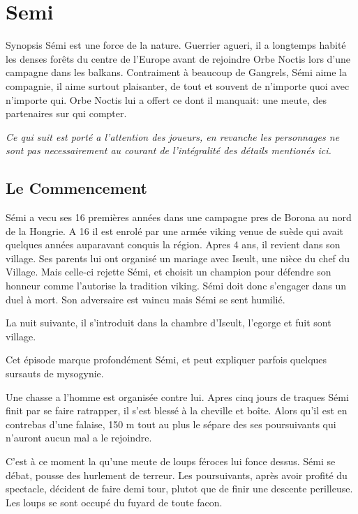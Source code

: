 \chapter{Semi}

\begin{commentbox}{Synopsis}
Sémi est une force de la nature. Guerrier agueri, il a longtemps habité les denses forêts
du centre de l'Europe avant de rejoindre Orbe Noctis lors d'une campagne dans les balkans.
Contraiment à beaucoup de Gangrels, Sémi aime la compagnie, il aime surtout plaisanter,
de tout et souvent de n'importe quoi avec n'importe qui. Orbe Noctis lui a offert ce dont il
manquait: une meute, des partenaires sur qui compter.
\end{commentbox}

\textit{Ce qui suit est porté a l'attention des joueurs, en revanche les personnages ne sont pas necessairement au courant de l'intégralité des détails mentionés ici.}

\section {Le Commencement}
Sémi a vecu ses 16 premières années dans une campagne pres de Borona au nord de la Hongrie. A 16 il est enrolé par une armée viking venue de suède qui avait quelques années auparavant conquis la région. Apres 4 ans, il revient dans son village. Ses parents lui ont organisé un mariage avec Iseult, une nièce du chef du Village. Mais celle-ci rejette Sémi, et choisit un champion pour défendre son honneur comme l'autorise la tradition viking. Sémi doit donc s'engager dans un duel à mort. Son adversaire est vaincu mais Sémi se sent humilié.

La nuit suivante, il s'introduit dans la chambre d'Iseult, l'egorge et fuit sont village.

\begin{quotebox}
Cet épisode marque profondément Sémi, et peut expliquer parfois quelques sursauts de mysogynie.
\end{quotebox}


Une chasse a l'homme est organisée contre lui. Apres cinq jours de traques Sémi finit par se faire ratrapper, il s'est blessé à la cheville et boîte.
Alors qu'il est en contrebas d'une falaise, 150 m tout au plus le sépare des ses poursuivants
qui n'auront aucun mal a le rejoindre. 

C'est à ce moment la qu'une meute de loups féroces lui fonce dessus. Sémi se débat, 
pousse des hurlement de terreur. Les poursuivants, après avoir profité du spectacle, 
décident de faire demi tour, plutot que de finir une descente perilleuse. Les loups
se sont occupé du fuyard de toute facon.

